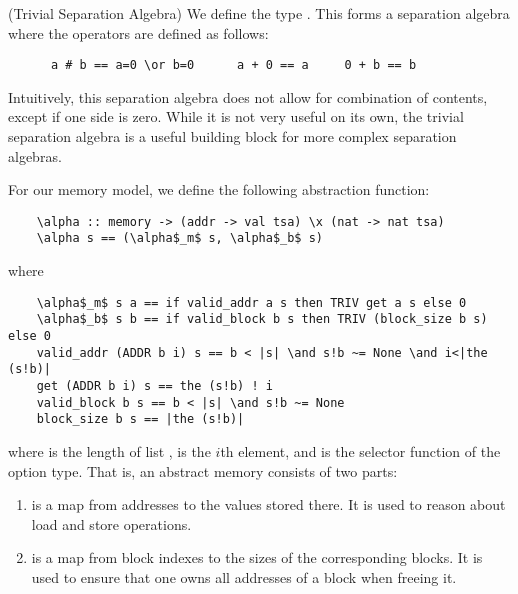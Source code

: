 \documentclass[runningheads]{llncs}
\begin{document}
  \begin{example}(Trivial Separation Algebra)
    We define the type . This forms a separation algebra where the operators are defined as follows:
    \begin{lstlisting}
      a # b == a=0 \or b=0      a + 0 == a     0 + b == b
    \end{lstlisting}
    Intuitively, this separation algebra does not allow for combination of contents, except if one side is zero.
    While it is not very useful on its own, the trivial separation algebra is a useful building block for
    more complex separation algebras.
  \end{example}

  For our memory model, we define the following abstraction function:
  \begin{lstlisting}
    \alpha :: memory -> (addr -> val tsa) \x (nat -> nat tsa)
    \alpha s == (\alpha$_m$ s, \alpha$_b$ s)
  \end{lstlisting}
  where
  \begin{lstlisting}
    \alpha$_m$ s a == if valid_addr a s then TRIV get a s else 0
    \alpha$_b$ s b == if valid_block b s then TRIV (block_size b s) else 0
    valid_addr (ADDR b i) s == b < |s| \and s!b ~= None \and i<|the (s!b)|
    get (ADDR b i) s == the (s!b) ! i
    valid_block b s == b < |s| \and s!b ~= None
    block_size b s == |the (s!b)|
  \end{lstlisting}
  where  is the length of list ,  is the $i$th element, and  is the selector function of the option type.
  That is, an abstract memory  consists of two parts:
  \begin{enumerate}
  \item {} is a map from addresses to the values stored there. It is used to reason about load and store operations.
  \item {} is a map from block indexes to the sizes of the corresponding blocks.
    It is used to ensure that one owns all addresses of a block when freeing it.
  \end{enumerate}
\end{document}
